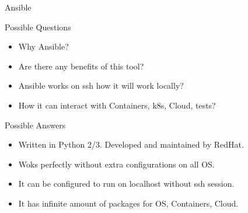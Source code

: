 \begin{frame}{Ansible}
	\begin{alertblock}{Possible Questions}
		\begin{itemize}
			\item<1-| alert@1> Why Ansible?
			\item<2-| alert@2> Are there any benefits of this tool?
			\item<3-| alert@3> Ansible works on ssh how it will work locally?
			\item<4-| alert@4> How it can interact with Containers, k8s, Cloud, tests?
		\end{itemize}	
	\end{alertblock}
	\begin{exampleblock}{Possible Answers}
		\begin{itemize}
			\item<1-| alert@1> Written in Python 2/3. Developed and maintained by RedHat.
			\item<2-| alert@2> Woks perfectly without extra configurations on all OS.
			\item<3-| alert@3> It can be configured to run on localhost without ssh session.
			\item<4-| alert@4> It has infinite amount of packages for OS, Containers, Cloud.
		\end{itemize}	
	\end{exampleblock}
\end{frame}
